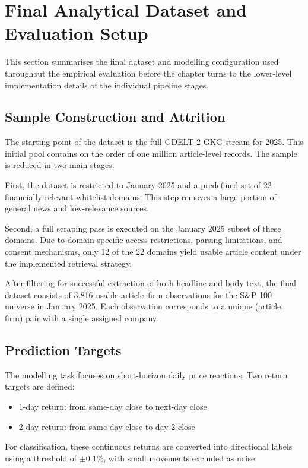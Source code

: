 \section{Final Analytical Dataset and Evaluation Setup}

This section summarises the final dataset and modelling configuration used throughout the empirical evaluation before the chapter turns to the lower-level implementation details of the individual pipeline stages.

\subsection{Sample Construction and Attrition}

The starting point of the dataset is the full GDELT 2 GKG stream for 2025. This initial pool contains on the order of one million article-level records. The sample is reduced in two main stages.

First, the dataset is restricted to January 2025 and  a predefined set of 22 financially relevant whitelist domains. This step removes a large portion of general news and low-relevance sources.

Second, a full scraping pass is executed on the January 2025 subset of these domains. Due to domain-specific access restrictions, parsing limitations, and consent mechanisms, only 12 of the 22 domains yield usable article content under the implemented retrieval strategy.

After filtering for successful extraction of both headline and body text, the final dataset consists of 3{,}816 usable article--firm observations for the S\&P 100 universe in January 2025. Each observation corresponds to a unique (article, firm) pair with a single assigned company.

\subsection{Prediction Targets}

The modelling task focuses on short-horizon daily price reactions. Two return targets are defined:
\begin{itemize}
    \item 1-day return: from same-day close to next-day close
    \item 2-day return: from same-day close to day-2 close
\end{itemize}

For classification, these continuous returns are converted into directional labels using a threshold of $\pm 0.1\%$, with small movements excluded as noise.


